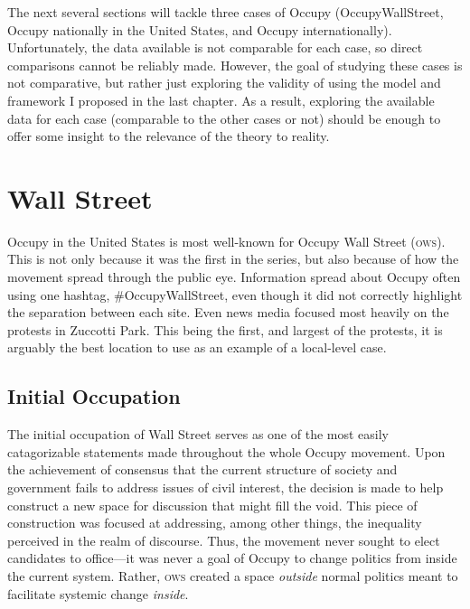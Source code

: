 \documentclass[openany,twoside]{memoir}
\begin{document}
\begin{Spacing}{2}
The next several sections will tackle three cases of Occupy (OccupyWallStreet, Occupy nationally in the United States, and Occupy internationally).
Unfortunately, the data available is not comparable for each case, so direct comparisons cannot be reliably made.
However, the goal of studying these cases is not comparative, but rather just exploring the validity of using the model and framework I proposed in the last chapter.
As a result, exploring the available data for each case (comparable to the other cases or not) should be enough to offer some insight to the relevance of the theory to reality.

\section{Wall Street}
Occupy in the United States is most well-known for Occupy Wall Street (\textsc{ows}).
This is not only because it was the first in the series, but also because of how the movement spread through the public eye.
Information spread about Occupy often using one hashtag, \#OccupyWallStreet, even though it did not correctly highlight the separation between each site.
Even news media focused most heavily on the protests in Zuccotti Park.
This being the first, and largest of the protests, it is arguably the best location to use as an example of a local-level case.

\subsection{Initial Occupation}
The initial occupation of Wall Street serves as one of the most easily catagorizable statements made throughout the whole Occupy movement.
Upon the achievement of consensus that the current structure of society and government fails to address issues of civil interest, the decision is made to help construct a new space for discussion that might fill the void.
This piece of construction was focused at addressing, among other things, the inequality perceived in the realm of discourse.
Thus, the movement never sought to elect candidates to office---it was never a goal of Occupy to change politics from inside the current system.
Rather, \textsc{ows} created a space \emph{outside} normal politics meant to facilitate systemic change \emph{inside}.


\end{Spacing}
\end{document}
